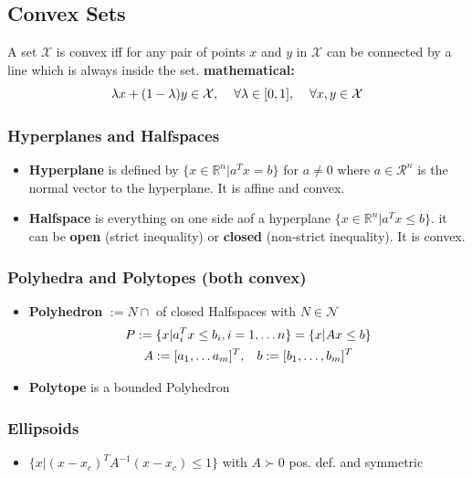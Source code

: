 \subsection{Convex Sets}
A set $\mathcal{X}$ is convex iff for any pair of points $x$ and $y$ in $\mathcal{X}$ can be connected by a line which is always inside the set.
\textbf{mathematical:} \[\lambda x + (1-\lambda) y\in \mathcal{X}, \hspace{4mm} \forall \lambda\in [0,1], \hspace{4mm} \forall x,y \in \mathcal{X} \]

\subsubsection{Hyperplanes and Halfspaces}
\begin{itemize}
    \item \textbf{Hyperplane} is defined by $\{x\in\mathbb{R}^n| a^Tx = b \}$ for $a \neq 0$ where $a \in \mathcal{R}^n$ is the normal vector to the hyperplane. It is affine and convex.
    \item \textbf{Halfspace} is everything on one side aof a hyperplane $\{x \in \mathbb{R}^n | a^T x \leq b\}$. it can be \textbf{open} (strict inequality) or \textbf{closed} (non-strict inequality). It is convex.
\end{itemize}

\subsubsection{Polyhedra and Polytopes \tiny{(both convex)}}
\begin{itemize}
    \item \textbf{Polyhedron} $:= N \cap$ of closed Halfspaces with $N \in \mathcal{N}$  
    \begin{gather*}P := \{x|a^T_i x \leq b_i,i=1, \dots n\} = \{x|Ax \leq b\}\\
    A := [a_1, \dots a_m]^T,\hspace{3mm} b := [b_1,\dots,b_m]^T
    \end{gather*}
    \item \textbf{Polytope} is a bounded Polyhedron
\end{itemize}
\subsubsection{Ellipsoids}
\begin{itemize}
    \item $\{x|(x-x_c)^T A^{-1}(x-x_c) \leq 1\}$ with  $A\succ 0$ pos. def. and symmetric
\end{itemize}

